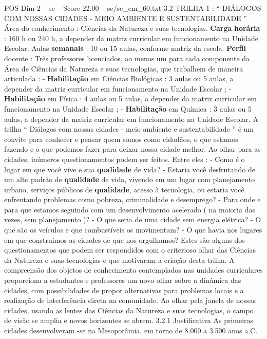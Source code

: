 \begin{textsample}{POS Dim 2 – sc – Score 22.00 – sc/sc\_em\_60.txt}  \label{ex:f2_pos_012}
3.2 TRILHA 1 : “ DIÁLOGOS COM NOSSAS CIDADES - MEIO AMBIENTE E SUSTENTABILIDADE ” Área do conhecimento : Ciências da Natureza e suas tecnologias. \textbf{Carga} \textbf{horária} : 160 h ou 240 h, a depender da matriz curricular em funcionamento na Unidade Escolar.
Aulas \textbf{semanais} : 10 ou 15 aulas, conforme matriz da escola. \textbf{Perfil} docente : Três professores licenciados, ao menos um para cada componente da Área de Ciências da Natureza e suas tecnologias, que trabalhem de maneira articulada : - \textbf{Habilitação} em Ciências Biológicas : 3 aulas ou 5 aulas, a depender da matriz curricular em funcionamento na Unidade Escolar ; - \textbf{Habilitação} em Física : 4 aulas ou 5 aulas, a depender da matriz curricular em funcionamento na Unidade Escolar ; - \textbf{Habilitação} em Química : 3 aulas ou 5 aulas, a depender da matriz curricular em funcionamento na Unidade Escolar.
A trilha “ Diálogos com nossas cidades - meio ambiente e sustentabilidade ” é um convite para conhecer e pensar quem somos como cidadãos, o que estamos fazendo e o que podemos fazer para deixar nossa cidade melhor.
Ao olhar para as cidades, inúmeros questionamentos podem ser feitos.
Entre eles : - Como é o lugar em que você vive e sua \textbf{qualidade} de vida? - Estaria você desfrutando de um alto padrão de \textbf{qualidade} de vida, vivendo em um lugar com planejamento urbano, serviços públicos de \textbf{qualidade}, acesso à tecnologia, ou estaria você enfrentando problemas como pobreza, criminalidade e desemprego? - Para onde e para que estamos seguindo com um desenvolvimento acelerado ( na maioria das vezes, sem planejamento )? - O que seria de uma cidade sem energia elétrica? - O que são os veículos e que combustíveis os movimentam? - O que havia nos lugares em que construímos as cidades de que nos orgulhamos?
Estes são alguns dos questionamentos que podem ser respondidos com o criterioso olhar das Ciências da Natureza e suas tecnologias e que motivaram a criação desta trilha.
A compreensão dos objetos de conhecimento contemplados nas unidades curriculares proporciona a estudantes e professores um novo olhar sobre a dinâmica das cidades, com possibilidades de propor alternativas para problemas locais e a realização de interferência direta na comunidade.
Ao olhar pela janela de nossas cidades, usando as lentes das Ciências da Natureza e suas tecnologias, o campo de visão se amplia e novos horizontes se abrem. 3.2.1 Justificativa As primeiras cidades desenvolveram -se na Mesopotâmia, em torno de 8.000 a 3.500 anos a.C.

\end{textsample}
